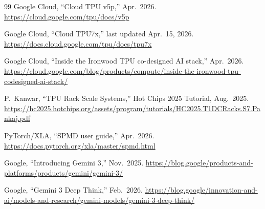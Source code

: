 \documentclass[conference]{IEEEtran}
\begin{document}
\begin{thebibliography}{99}
 Google Cloud, ``Cloud TPU v5p,'' Apr.\ 2026.
\url{https://cloud.google.com/tpu/docs/v5p}

 Google Cloud, ``Cloud TPU7x,'' last updated
Apr.\ 15, 2026.
\url{https://docs.cloud.google.com/tpu/docs/tpu7x}

 Google Cloud, ``Inside the Ironwood TPU
co-designed AI stack,'' Apr.\ 2026.
\url{https://cloud.google.com/blog/products/compute/inside-the-ironwood-tpu-codesigned-ai-stack/}

 P.\ Kanwar, ``TPU Rack Scale Systems,''
Hot Chips 2025 Tutorial, Aug.\ 2025.
\url{https://hc2025.hotchips.org/assets/program/tutorials/HC2025.T1DCRacks.S7.Pankaj.pdf}

 PyTorch/XLA, ``SPMD user guide,'' Apr.\ 2026.
\url{https://docs.pytorch.org/xla/master/spmd.html}

 Google, ``Introducing Gemini 3,'' Nov.\ 2025.
\url{https://blog.google/products-and-platforms/products/gemini/gemini-3/}

 Google, ``Gemini 3 Deep Think,'' Feb.\ 2026.
\url{https://blog.google/innovation-and-ai/models-and-research/gemini-models/gemini-3-deep-think/}

\end{thebibliography}
\end{document}
